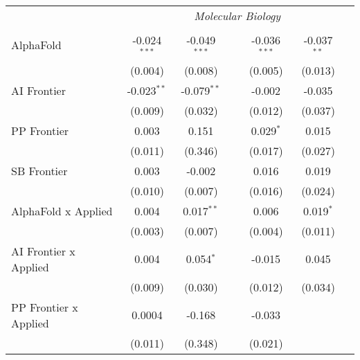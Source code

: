 \begin{tabular}{lcccccc}
 & \multicolumn{6}{c}{\textit{Molecular Biology}} \\ \\
   AlphaFold                                   & -0.024$^{***}$ & -0.049$^{***}$ &                & -0.036$^{***}$ & -0.037$^{**}$ &   \\   
                                               & (0.004)        & (0.008)        &                & (0.005)        & (0.013)       &   \\   
   AI Frontier                                 & -0.023$^{**}$  & -0.079$^{**}$  &                & -0.002         & -0.035        &   \\   
                                               & (0.009)        & (0.032)        &                & (0.012)        & (0.037)       &   \\   
   PP Frontier                                 & 0.003          & 0.151          &                & 0.029$^{*}$    & 0.015         &   \\   
                                               & (0.011)        & (0.346)        &                & (0.017)        & (0.027)       &   \\   
   SB Frontier                                 & 0.003          & -0.002         &                & 0.016          & 0.019         &   \\   
                                               & (0.010)        & (0.007)        &                & (0.016)        & (0.024)       &   \\   
   AlphaFold x Applied                         & 0.004          & 0.017$^{**}$   &                & 0.006          & 0.019$^{*}$   &   \\   
                                               & (0.003)        & (0.007)        &                & (0.004)        & (0.011)       &   \\   
   AI Frontier x Applied                       & 0.004          & 0.054$^{*}$    &                & -0.015         & 0.045         &   \\   
                                               & (0.009)        & (0.030)        &                & (0.012)        & (0.034)       &   \\   
   PP Frontier x Applied                       & 0.0004         & -0.168         &                & -0.033         &               &   \\   
                                               & (0.011)        & (0.348)        &                & (0.021)        &               &   \\   

\end{tabular}
